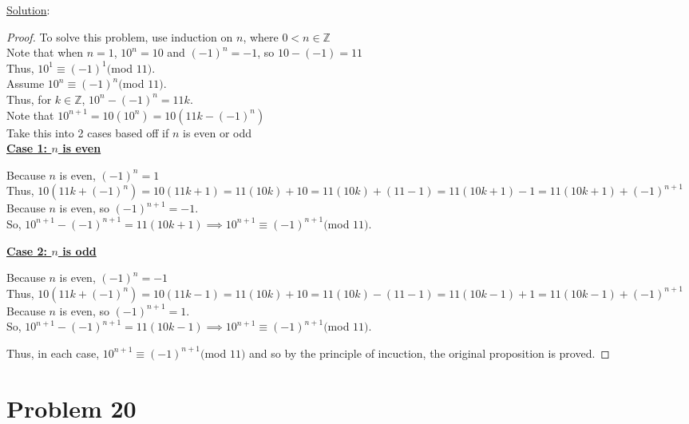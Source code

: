 \documentclass{article} %
\begin{document}
\underline{Solution}: 
\begin{addmargin}[1em]{0em}
\begin{proof}
To solve this problem, use induction on $n$, where $0 < n \in \mathbb{Z}$
\\ 
Note that when $n = 1$, $10^n = 10$ and $(-1)^n = -1$, so $10 - (-1) = 11$
\\Thus, $10^1 \equiv (-1)^1 ($mod $11)$.
\\ 
Assume $10^n \equiv (-1)^n($mod $11)$.
\\Thus, for $k \in \mathbb{Z}$, $10^n - (-1)^n = 11k$.
\\ 
Note that $10^{n+1} = 10(10^n) = 10(11k - (-1)^n)$
\\Take this into 2 cases based off if $n$ is even or odd
\\ \underline{\textbf{Case 1: $n$ is even}}
\begin{addmargin}[1em]{0em}
Because $n$ is even, $(-1)^n = 1$
\\Thus, $10(11k + (-1)^n) = 10(11k + 1) = 11(10k) + 10 = 11(10k) + (11 - 1) = 11(10k + 1) - 1 = 11(10k + 1) + (-1)^{n+1}$
\\Because $n$ is even, so $(-1)^{n+1} = -1$.
\\So, $10^{n+1} - (-1)^{n+1} = 11(10k + 1) \implies 10^{n+1} \equiv (-1)^{n+1}($mod $11)$.
\end{addmargin}
\underline{\textbf{Case 2: $n$ is odd}}
\begin{addmargin}[1em]{0em}
Because $n$ is even, $(-1)^n = -1$
\\Thus, $10(11k + (-1)^n) = 10(11k - 1) = 11(10k) + 10 = 11(10k) - (11 - 1) = 11(10k - 1) + 1 = 11(10k - 1) + (-1)^{n+1}$
\\Because $n$ is even, so $(-1)^{n+1} = 1$.
\\So, $10^{n+1} - (-1)^{n+1} = 11(10k - 1) \implies 10^{n+1} \equiv (-1)^{n+1}($mod $11)$.
\end{addmargin}
Thus, in each case, $10^{n+1} \equiv (-1)^{n+1}($mod $11)$ and so by the principle of incuction, the original proposition is proved.
\end{proof}
\end{addmargin}

\newpage

\section*{Problem 20}
\end{document}
